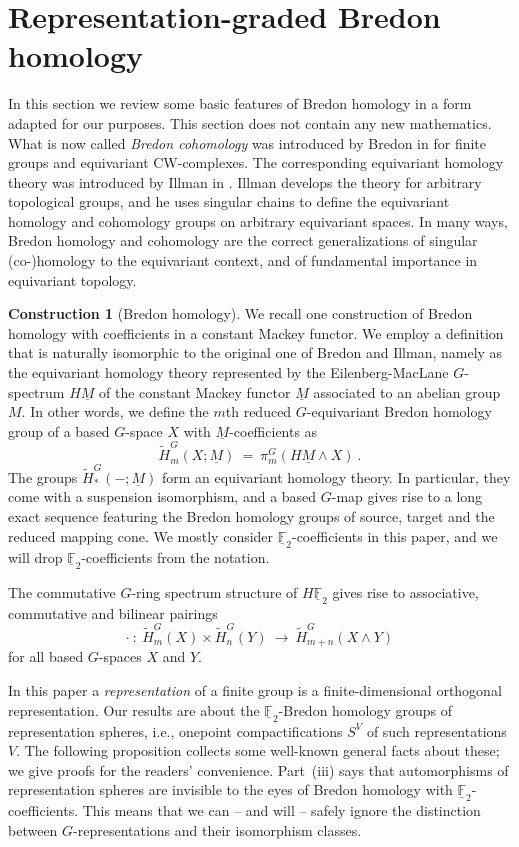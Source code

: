 \documentclass{amsart}[12pt]
\newcommand{\mF}{{\mathbb F}}
\newcommand{\sm}{\wedge}
\renewcommand{\to}{\longrightarrow}
\numberwithin{equation}{section}
\theoremstyle{definition}
\newtheorem{construction}[equation]{Construction}
\begin{document}
\section{Representation-graded Bredon homology} 

In this section we review some basic features of Bredon homology in a form adapted
for our purposes. This section does not contain any new mathematics.
What is now called {\em Bredon cohomology} was introduced by Bredon in \cite{bredon}
for finite groups and equivariant CW-complexes. The corresponding equivariant homology
theory was introduced by Illman in \cite{illman:equivariant singular}.
Illman develops the theory for arbitrary topological groups,
and he uses singular chains to define the equivariant homology
and cohomology groups on arbitrary equivariant spaces.
In many ways, Bredon homology and cohomology are the correct generalizations
of singular \mbox{(co-)}homology to the equivariant context,
and of fundamental importance in equivariant topology.


\begin{construction}[Bredon homology]
  We recall one construction of Bredon homology with coefficients in a constant Mackey functor.
  We employ a definition that is naturally isomorphic to the original one of Bredon and Illman,
  namely as the equivariant homology theory represented by the Eilenberg-MacLane $G$-spectrum
  $H\underline M$ of the constant Mackey functor
  $\underline M$ associated to an abelian group $M$.
  In other words, we define the $m$th reduced $G$-equivariant Bredon homology group
  of a based $G$-space $X$ with $\underline M$-coefficients as
  \[ \tilde H_m^G(X;\underline M) \ = \ \pi_m^G(H\underline M\sm X)\ .\]
  The groups $\tilde H^G_*(-;\underline M)$ form an equivariant homology theory.
  In particular, they come with a suspension isomorphism,
  and a based $G$-map gives rise to a long exact sequence featuring the Bredon homology groups
  of source, target and the reduced mapping cone.
  We mostly consider $\underline \mF_2$-coefficients in this paper,
  and we will drop $\underline \mF_2$-coefficients from the notation.

  The commutative $G$-ring spectrum structure of $H\underline\mF_2$ gives
  rise to associative, commutative and bilinear pairings
  \[ \cdot \ : \ \tilde H_m^G(X)\times \tilde H_n^G(Y)\ \to \ \tilde H^G_{m+n}(X\sm Y) \]
  for all based $G$-spaces $X$ and $Y$.
\end{construction}

In this paper a {\em representation} of a finite group is a finite-dimensional
orthogonal representation.
Our results are about the $\underline\mF_2$-Bredon homology groups
of representation spheres, i.e., onepoint compactifications $S^V$ of such representations $V$.
The following proposition collects some well-known general facts about these;
we give proofs for the readers' convenience.
Part~(iii) says that automorphisms of representation spheres
are invisible to the eyes of Bredon homology with  $\underline\mF_2$-coefficients.
This means that we can -- and will -- safely ignore the distinction
between $G$-representations and their isomorphism classes.
\end{document}

